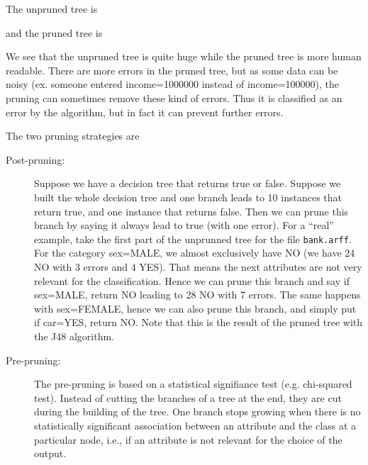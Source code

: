 \documentclass[fontsize=12pt, usenames, dvipsnames, headinclude, headsepline, footinclude, footsepline]{scrartcl}
\begin{document}
  \begin{sol}
    The unpruned tree is
    
    

    and the pruned tree is
    
    

    We see that the unpruned tree is quite huge while the pruned tree is more human readable. There are more
    errors in the pruned tree, but as some data can be noisy (ex. someone entered income=1000000 instead of
    income=100000), the pruning can sometimes remove these kind of errors. Thus it is classified as an error
    by the algorithm, but in fact it can prevent further errors. 

    The two pruning strategies are 
    \begin{description}
    \item[Post-pruning:] Suppose we have a decision tree that returns true or false. Suppose we built the
      whole decision tree and one branch leads to 10 instances that return true, and one instance that returns
      false. Then we can prune this branch by saying it always lead to true (with one error). For a ``real''
      example, take the first part of the unprunned tree for the file \texttt{bank.arff}. For the category
      sex=MALE, we almost exclusively have NO (we have 24 NO with 3 errors and 4 YES). That means the next
      attributes are not very relevant for the classification. Hence we can prune this branch and say if
      sex=MALE, return NO leading to 28 NO with 7 errors. The same happens with sex=FEMALE, hence we can also
      prune this branch, and simply put if car=YES, return NO. Note that this is the result of the pruned tree
      with the J48 algorithm.

    \item[Pre-pruning:] The pre-pruning is based on a statistical signifiance test (e.g. chi-squared
      test). Instead of cutting the branches of a tree at the end, they are cut during the building of the
      tree. One branch stops growing when there is no statistically significant association between an
      attribute and the class at a particular node, i.e., if an attribute is not relevant for the choice of
      the output. 


\end{description}
\end{sol}
\end{document}

